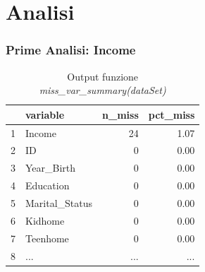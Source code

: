 \section{Analisi}
\begin{frame}[fragile]
\frametitle{Prime Analisi: Income}
\begin{table}[H]
\centering
\begin{tabular}{rlrr}
  \hline
 & variable & n\_miss & pct\_miss \\ 
  \hline
1 & Income &  24 & 1.07 \\ 
  2 & ID &   0 & 0.00 \\ 
  3 & Year\_Birth &   0 & 0.00 \\ 
  4 & Education &   0 & 0.00 \\ 
  5 & Marital\_Status &   0 & 0.00 \\ 
  6 & Kidhome &   0 & 0.00 \\ 
  7 & Teenhome &   0 & 0.00 \\ 
  8 & ... & ... & ... \\
   \hline
\end{tabular}

    \caption{Output funzione \textit{miss\_var\_summary(dataSet)}}
   
   \label{fig:miss_var_summary(dataSet)}
\end{table}
\end{frame}
